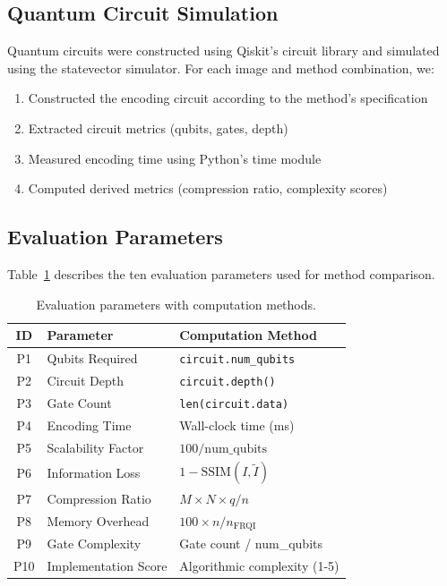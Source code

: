 \documentclass{ipol}
\begin{document}
\subsection{Quantum Circuit Simulation}

Quantum circuits were constructed using Qiskit's circuit library and simulated using the statevector simulator. For each image and method combination, we:

\begin{enumerate}
\item Constructed the encoding circuit according to the method's specification
\item Extracted circuit metrics (qubits, gates, depth)
\item Measured encoding time using Python's time module
\item Computed derived metrics (compression ratio, complexity scores) \cite{bib72,bib73}
\end{enumerate}

\subsection{Evaluation Parameters}

Table~\ref{tab:eval_params} describes the ten evaluation parameters used for method comparison.

\begin{table}[!htbp]
\caption{Evaluation parameters with computation methods.}
\label{tab:eval_params}
\centering
\begin{tabular}{@{}clp{6cm}@{}}
\toprule
ID & Parameter & Computation Method \\
\midrule
P1 & Qubits Required & \texttt{circuit.num\_qubits} \\
P2 & Circuit Depth & \texttt{circuit.depth()} \\
P3 & Gate Count & \texttt{len(circuit.data)} \\
P4 & Encoding Time & Wall-clock time (ms) \\
P5 & Scalability Factor & $100 / \text{num\_qubits}$ \\
P6 & Information Loss & $1 - \text{SSIM}(I, \tilde{I})$ \\
P7 & Compression Ratio & $M \times N \times q / n$ \\
P8 & Memory Overhead & $100 \times n / n_{\text{FRQI}}$ \\
P9 & Gate Complexity & Gate count / num\_qubits \\
P10 & Implementation Score & Algorithmic complexity (1-5) \\
\bottomrule
\end{tabular}
\end{table}
\end{document}
